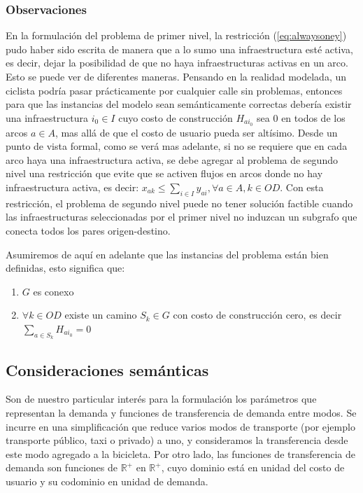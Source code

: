 \documentclass{article}
\begin{document}
  \subsubsection*{Observaciones}

  En la formulación del problema de primer nivel, la restricción (\ref{eq:alwaysoney}) pudo haber sido escrita de manera que a lo sumo una infraestructura esté activa, es decir, dejar la posibilidad de que no haya infraestructuras activas en un arco. Esto se puede ver de diferentes maneras. Pensando en la realidad modelada, un ciclista podría pasar prácticamente por cualquier calle sin problemas, entonces para que las instancias del modelo sean semánticamente correctas debería existir una infraestructura $i_0 \in I$ cuyo costo de construcción $H_{ai_0}$ sea 0 en todos de los arcos $a \in A$, mas allá de que el costo de usuario pueda ser altísimo. Desde un punto de vista formal, como se verá mas adelante, si no se requiere que en cada arco haya una infraestructura activa, se debe agregar al problema de segundo nivel una restricción que evite que se activen flujos en arcos donde no hay infraestructura activa, es decir: $x_{ak} \leq \sum_{i \in I} y_{ai}, \forall a \in A, k \in OD$. Con esta restricción, el problema de segundo nivel puede no tener solución factible cuando las infraestructuras seleccionadas por el primer nivel no induzcan un subgrafo que conecta todos los pares origen-destino.

  Asumiremos de aquí en adelante que las instancias del problema están bien definidas, esto significa que:

  \begin{enumerate}
    \item {$G$ es conexo}
    \item {$\forall k \in OD$ existe un camino $S_k \in G$ con costo de construcción cero, es decir $\sum_{a \in S_k} H_{ai_0} = 0$}
  \end{enumerate}

  \subsection{Consideraciones semánticas}

  Son de nuestro particular interés para la formulación los parámetros que representan la demanda y funciones de transferencia de demanda entre modos. Se incurre en una simplificación que reduce varios modos de transporte (por ejemplo transporte público, taxi o privado) a uno, y consideramos la transferencia desde este modo agregado a la bicicleta. Por otro lado, las funciones de transferencia de demanda son funciones de $\mathbb{R}^+$ en $\mathbb{R}^+$, cuyo dominio está en unidad del costo de usuario y su codominio en unidad de demanda.
\end{document}
